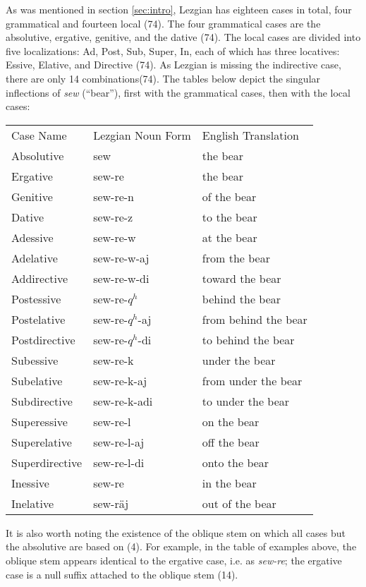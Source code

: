 As was mentioned in section \ref{sec:intro}, Lezgian has eighteen cases in total, four grammatical and fourteen local (74). The four grammatical cases are the absolutive, ergative, genitive, and the dative (74). The local cases are divided into five localizations: Ad, Post, Sub, Super, In, each of which has three locatives: Essive, Elative, and Directive (74). As Lezgian is missing the indirective case, there are only 14 combinations(74). The tables below depict the singular inflections of \textit{sew} (``bear''), first with the grammatical cases, then with the local cases:
\begin{center}
    \begin{tabular}{|l|l|l|}
        \hline
        Case Name & Lezgian Noun Form & English Translation \\ \hhline{|=|=|=|}
        Absolutive & sew &the bear \\
        Ergative & sew-re &the bear \\
        Genitive & sew-re-n &of the bear \\
        Dative & sew-re-z &to the bear \\ \hline
        Adessive & sew-re-w &at the bear \\
        Adelative & sew-re-w-aj &from the bear \\
        Addirective & sew-re-w-di & toward the bear \\ \hline
        Postessive & sew-re-$q^h$ & behind the bear \\
        Postelative & sew-re-$q^h$-aj & from behind the bear \\
        Postdirective & sew-re-$q^h$-di & to behind the bear \\ \hline
        Subessive & sew-re-k & under the bear \\
        Subelative & sew-re-k-aj & from under the bear \\
        Subdirective & sew-re-k-adi & to under the bear \\ \hline
        Superessive & sew-re-l & on the bear \\
        Superelative & sew-re-l-aj & off the bear \\
        Superdirective & sew-re-l-di & onto the bear \\ \hline
        Inessive & sew-re & in the bear \\
        Inelative & sew-r\"{a}j & out of the bear \\ \hline
    \end{tabular}
\end{center}
It is also worth noting the existence of the oblique stem on which all cases but the absolutive are based on (4). For example, in the table of examples above, the oblique stem appears identical to the ergative case, i.e. as \textit{sew-re}; the ergative case is a null suffix attached to the oblique stem (14).

